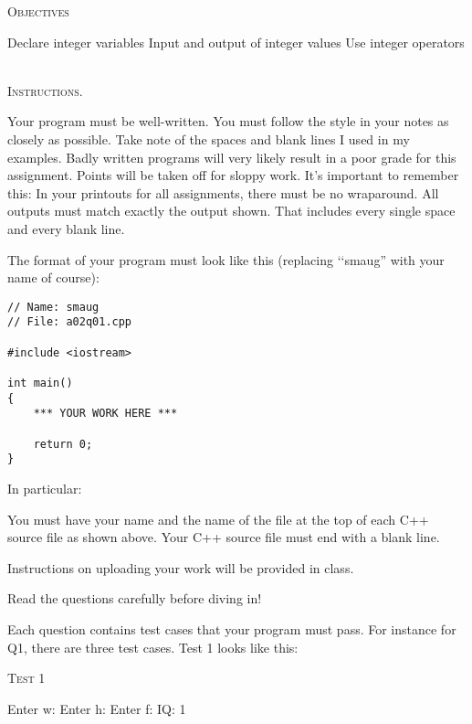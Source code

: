 


\renewcommand\TITLE{Assignment 2}
\usepackage{import}


\topmatter

\textsc{Objectives}
 \begin{myenum}
   \li Declare integer variables
   \li Input and output of integer values
   \li Use integer operators
 \end{myenum}
\mbox{}\\

\textsc{Instructions.}
\begin{enumerate}
\li Your program must be well-written. 
    You must follow the style in your notes as closely as possible. 
    Take note of the spaces and blank lines I used in my examples. 
    Badly written programs will very likely result in a poor grade for this 
    assignment. 
    Points will be taken off for sloppy work. 
\li It's important to remember this: In your printouts for all assignments, 
    there must be no wraparound.
\li All outputs must match exactly the output shown. 
    That includes every single space and every blank line.

\li The format of your program must look like this
(replacing \lq\lq smaug'' with your name of course):
\begin{Verbatim}[frame=single,fontsize=\small]
// Name: smaug
// File: a02q01.cpp

#include <iostream>

int main()
{
    *** YOUR WORK HERE ***

    return 0;
}
\end{Verbatim}
In particular:
\begin{enumerate}
\li You must have your name and the name of the file at the top of each 
    C++ source file as shown above.
\li Your C++ source file must end with a blank line.
\end{enumerate}

\li Instructions on uploading your work will be provided in class.

\end{enumerate}

Read the questions carefully before diving in!

Each question contains test cases that your program must pass. For instance for Q1, there are three test cases. Test 1 looks like this:

\textsc{Test 1}
\begin{console}[commandchars=\\\{\}]
Enter w: 
Enter h: 
Enter f: 
IQ: 1
\end{console}

